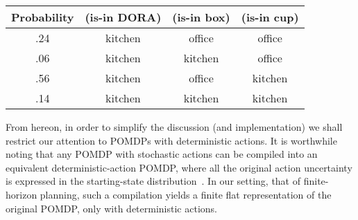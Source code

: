 \small
\begin{tabular}{cccc}
\hline
Probability & (is-in DORA)  & (is-in box)  & (is-in cup) \\
\hline
.24 & kitchen & office & office \\
.06 & kitchen & kitchen & office \\
.56 & kitchen & office & kitchen \\
.14 & kitchen & kitchen & kitchen \\
\hline
\end{tabular}
\normalsize

From hereon, in order to simplify the discussion (and implementation)
we shall restrict our attention to POMDPs with deterministic
actions. It is worthwhile noting that any POMDP with stochastic
actions can be compiled into an equivalent deterministic-action POMDP,
where all the original action uncertainty is expressed in the
starting-state distribution~\cite{ng:Jordan:2000}. In our setting,
that of finite-horizon planning, such a compilation yields a finite
flat representation of the original POMDP, only with deterministic
actions.
